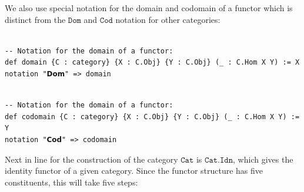 \documentclass{book}
\newcounter{lcounter}
\begin{document}
We also use special notation for the domain and codomain of a functor which is distinct from the $\texttt{Dom}$ and $\texttt{Cod}$ notation for other categories:

\begin{center}
\begin{tcolorbox}[width=5in,colback={white},title={\begin{center}\texttt{Lean \thelcounter} \addtocounter{lcounter}{1}  \end{center}},colbacktitle=Blue,coltitle=black]
\begin{verbatim}

-- Notation for the domain of a functor:
def domain {C : category} {X : C.Obj} {Y : C.Obj} (_ : C.Hom X Y) := X
notation "𝗗𝗼𝗺" => domain

\end{verbatim}%
\end{tcolorbox}
\end{center}

\begin{center}
\begin{tcolorbox}[width=5in,colback={white},title={\begin{center}\texttt{Lean \thelcounter} \addtocounter{lcounter}{1}  \end{center}},colbacktitle=Blue,coltitle=black]
\begin{verbatim}

-- Notation for the domain of a functor:
def codomain {C : category} {X : C.Obj} {Y : C.Obj} (_ : C.Hom X Y) := Y
notation "𝗖𝗼𝗱" => codomain

\end{verbatim}%
\end{tcolorbox}
\end{center}

Next in line for the construction of the category $\texttt{Cat}$ is $\texttt{Cat.Idn}$, which gives the identity functor of a given category. Since the functor structure has five constituents, this will take five steps:
\end{document}
